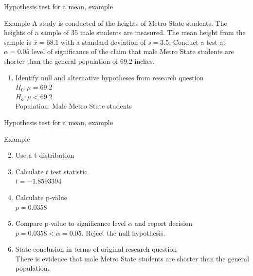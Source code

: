 \documentclass[xcolor=table, handout]{beamer}
\begin{document}
\begin{frame}{Hypothesis test for a mean, example}
\begin{exampleblock}{Example}
\large
A study is conducted of the heights of Metro State students. The heights of a sample of 35 male students are measured. The mean height from the sample is $\bar x = 68.1$ with a standard deviation of $s=3.5$. Conduct a test at $\alpha=0.05$ level of significance of the claim that male Metro State students are shorter than the general population of 69.2 inches.
\begin{enumerate}
\pause\item Identify null and alternative hypotheses from research question\\
\pause$H_0: \mu = 69.2$\\
$H_a: \mu < 69.2$\\
Population: Male Metro State students
\end{enumerate}
\end{exampleblock}
\end{frame}

\begin{frame}{Hypothesis test for a mean, example}
\begin{exampleblock}{Example}
\large
\begin{enumerate}
\setcounter{enumi}{1}

\item Use a t distribution
\pause\item Calculate $t$ test statistic\\
\pause$t=-1.8593394$
\pause\item Calculate p-value\\
\pause$p = 0.0358$
\pause\item Compare p-value to significance level $\alpha$ and report decision\\
\pause$p = 0.0358 < \alpha = 0.05$. Reject the null hypothesis.
\pause\item State conclusion in terms of original research question\\
\pause There is evidence that male Metro State students are shorter than the general population.
\end{enumerate}

\end{exampleblock}
\end{frame}
\end{document}
